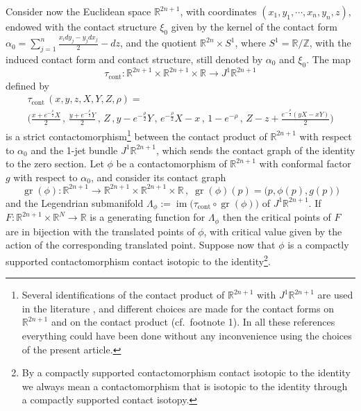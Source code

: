 \documentclass{amsart}
\DeclareMathOperator{\gr}{gr}
\DeclareMathOperator{\im}{im}
\DeclareMathOperator{\cont}{cont}
\theoremstyle{remark}
\begin{document}
Consider now the Euclidean space $\mathbb{R}^{2n+1}$,
with coordinates $(x_1, y_1, \cdots, x_n, y_n, z)$,
endowed with the contact structure $\xi_0$
given by the kernel of the contact form
$\alpha_0 = \sum_{j=1}^n \frac{x_idy_j - y_jdx_j}{2} - dz$,
and the quotient $\mathbb{R}^{2n} \times S^1$,
where $S^1 = \mathbb{R}/\mathbb{Z}$,
with the induced contact form and contact structure,
still denoted by $\alpha_0$ and $\xi_0$.
The map
\[
\tau_{\cont}: \mathbb{R}^{2n+1} \times \mathbb{R}^{2n+1} \times \mathbb{R}
\rightarrow J^1 \mathbb{R}^{2n+1}
\]
defined by
\begin{gather*}
\tau_{\cont} \, (x, y, z, X, Y, Z, \rho) =
\\
\Big(\frac{ x + e^{-\frac{\rho}{2}}X}{2} \,,\,
\frac{ y + e^{-\frac{\rho}{2}}Y}{2}
\,,\, Z \,,
y - e^{-\frac{\rho}{2}} Y \,,\,
e^{-\frac{\rho}{2}} X - x\,,\,
1 - e^{-\rho} \,,\,
Z - z 
+ \frac{e^{-\frac{\rho}{2}} (yX - xY)}{2}\Big)
\end{gather*}
is a strict contactomorphism\footnote{
Several identifications
of the contact product of $\mathbb{R}^{2n+1}$
with $J^1\mathbb{R}^{2n+1}$
are used in the literature
\cite{Bhupal, San10, San11, FSZ},
and different choices are made
for the contact forms on $\mathbb{R}^{2n+1}$
and on the contact product
(cf.\ footnote 1).
In all these references everything could have been done
without any inconvenience
using the choices of the present article.}
between the contact product
of $\mathbb{R}^{2n+1}$ with respect to $\alpha_0$
and the 1-jet bundle $J^1\mathbb{R}^{2n+1}$,
which sends the contact graph of the identity
to the zero section.
Let $\phi$ be a contactomorphism of $\mathbb{R}^{2n+1}$
with conformal factor $g$ with respect to $\alpha_0$,
and consider its contact graph
\[
\gr (\phi): \mathbb{R}^{2n+1} \rightarrow
\mathbb{R}^{2n+1} \times \mathbb{R}^{2n+1} \times \mathbb{R} \,,\;
\gr(\phi)(p) = \big( p, \phi(p), g(p) \big)
\]
and the Legendrian submanifold
$\Lambda_{\phi} := \im \big( \tau_{\cont} \circ \gr(\phi) \big)$
of $J^1\mathbb{R}^{2n+1}$.
If $F: \mathbb{R}^{2n+1} \times \mathbb{R}^N \rightarrow \mathbb{R}$
is a generating function for $\Lambda_{\phi}$
then the critical points of $F$
are in bijection with the translated points of $\phi$,
with critical value given by the action
of the corresponding translated point.
Suppose now that $\phi$
is a compactly supported contactomorphism
contact isotopic to the identity\footnote{
By a compactly supported contactomorphism
contact isotopic to the identity
we always mean a contactomorphism
that is isotopic to the identity
through a compactly supported contact isotopy.}.
\end{document}
